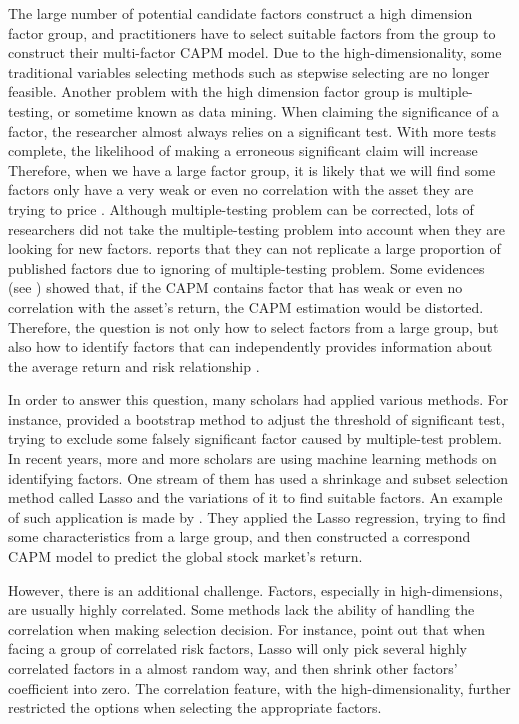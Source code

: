 The large number of potential candidate factors construct a high dimension factor group, and practitioners have to select suitable factors from the group to construct their multi-factor CAPM model. 
Due to the high-dimensionality, some traditional variables selecting methods such as stepwise selecting are no longer feasible.
Another problem with the high dimension factor group is multiple-testing, or sometime known as data mining. 
When claiming the significance of a factor, the researcher almost always relies on a significant test. With more tests complete, the likelihood of making a erroneous significant claim will increase
Therefore, when we have a large factor group, it is likely that we will find some factors only have a very weak or even no correlation with the asset they are trying to price \cite{Harvey2017}.
Although multiple-testing problem can be corrected, lots of researchers did not take the multiple-testing problem into account when they are looking for new factors.
 reports that they can not replicate a large proportion of published factors due to  ignoring of multiple-testing problem.
Some evidences (see ) showed that, if the CAPM contains factor that has weak or even no correlation with the asset's return, the CAPM estimation would be distorted.
Therefore, the question is not only how to select factors from a large group, but also how to identify factors that can independently provides information about the average return and risk relationship \cite{Cochrane2011}.


In order to answer this question, many scholars had applied various methods.
For instance,  provided a bootstrap method to adjust the threshold of significant test, trying to exclude some falsely significant factor caused by multiple-test problem.
In recent years, more and more scholars are using machine learning methods on identifying factors.
One stream of them has used a shrinkage and subset selection method called Lasso \cite{Tibshirani1996} and the variations of it to find suitable factors.
An example of such application is made by .
They applied the Lasso regression, trying to find some characteristics from a large group, and then constructed a correspond CAPM model to predict the global stock market's return.

However, there is an additional challenge.
Factors, especially in high-dimensions, are usually highly correlated.
Some methods lack the ability of handling the correlation when making selection decision.
For instance,  point out that when facing a group of correlated risk factors, Lasso will only pick several highly correlated factors in a almost random way, and then shrink other factors' coefficient into zero.
The correlation feature, with the high-dimensionality, further restricted the options when selecting the appropriate factors.

